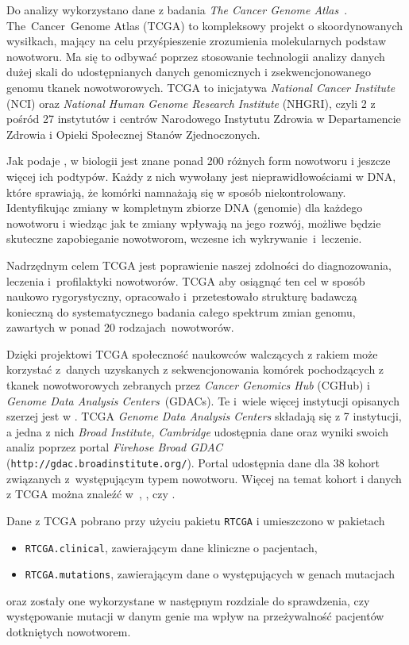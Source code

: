 Do analizy wykorzystano dane z badania \textit{The Cancer Genome Atlas}~\cite{broad}. The~Cancer~Genome Atlas (TCGA) to kompleksowy projekt o skoordynowanych wysiłkach, mający na celu przyśpieszenie zrozumienia molekularnych podstaw nowotworu. Ma się to odbywać poprzez stosowanie technologii analizy danych dużej skali do udostępnianych danych genomicznych i zsekwencjonowanego genomu tkanek nowotworowych. TCGA to inicjatywa \textit{National Cancer Institute} (NCI) oraz \textit{National Human Genome Research Institute} (NHGRI), czyli 2 z pośród 27 instytutów i centrów Narodowego Instytutu Zdrowia w Departamencie Zdrowia i Opieki Społecznej Stanów Zjednoczonych.

Jak podaje \cite{patrycja}, w biologii jest znane ponad 200 różnych form nowotworu i jeszcze więcej ich podtypów. Każdy z nich wywołany jest nieprawidłowościami w DNA, które sprawiają, że komórki namnażają się w sposób niekontrolowany. Identyfikując zmiany w kompletnym zbiorze DNA (genomie) dla każdego nowotworu i wiedząc jak te zmiany wpływają na jego rozwój, możliwe będzie skuteczne zapobieganie nowotworom, wczesne ich wykrywanie~i~leczenie. 

Nadrzędnym celem TCGA jest poprawienie naszej zdolności do diagnozowania, leczenia i~profilaktyki nowotworów. TCGA aby osiągnąć ten cel w sposób naukowo rygorystyczny, opracowało i~przetestowało strukturę badawczą konieczną do systematycznego badania całego spektrum zmian genomu, zawartych w ponad 20 rodzajach~nowotworów.

Dzięki projektowi TCGA społeczność naukowców walczących z rakiem może korzystać z~danych uzyskanych z sekwencjonowania komórek pochodzących z tkanek nowotworowych zebranych przez \textit{Cancer Genomics Hub} (CGHub) i \textit{Genome Data Analysis Centers}~(GDACs). Te i~wiele więcej instytucji opisanych szerzej jest w \cite{patrycja}. TCGA \textit{Genome Data Analysis Centers} składają się z 7 instytucji, a jedna z nich \textit{Broad Institute, Cambridge} udostępnia dane oraz wyniki swoich analiz poprzez portal \textit{Firehose Broad GDAC} (\texttt{http://gdac.broadinstitute.org/}). Portal udostępnia dane dla 38 kohort związanych z~występującym typem nowotworu. Więcej na temat kohort i danych z TCGA można znaleźć w~\cite{chin1}, \cite{chin2}, \cite{future} czy \cite{patrycja}. 

Dane z TCGA pobrano przy użyciu pakietu \texttt{RTCGA} i umieszczono w pakietach \\ \citep{kosa1, kosa2, kosa3}
\begin{itemize}
\item \texttt{RTCGA.clinical}, zawierającym dane kliniczne o pacjentach,
\item \texttt{RTCGA.mutations}, zawierającym dane o występujących w genach mutacjach
\end{itemize} 
oraz zostały one wykorzystane w następnym rozdziale do sprawdzenia, czy występowanie mutacji w danym genie ma wpływ na przeżywalność pacjentów dotkniętych nowotworem.


